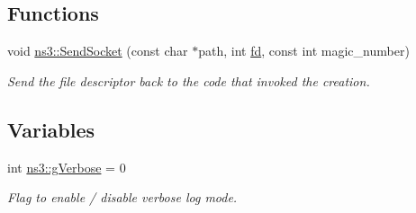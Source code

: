 \subsection*{Functions}
\begin{DoxyCompactItemize}
\item 
void \hyperlink{group__fd-net-device_gacca4623034d2ebd58b9eebb916545ceb}{ns3\+::\+Send\+Socket} (const char $\ast$path, int \hyperlink{mmwave_2model_2fading-traces_2fading__trace__generator_8m_a44f21d5190b5a6df8089f54799628d7e}{fd}, const int magic\+\_\+number)
\begin{DoxyCompactList}\small\item\em Send the file descriptor back to the code that invoked the creation. \end{DoxyCompactList}\end{DoxyCompactItemize}
\subsection*{Variables}
\begin{DoxyCompactItemize}
\item 
int \hyperlink{namespacens3_a33d3a2b706248809770367cfc2fe7ab8}{ns3\+::g\+Verbose} = 0
\begin{DoxyCompactList}\small\item\em Flag to enable / disable verbose log mode. \end{DoxyCompactList}\end{DoxyCompactItemize}
